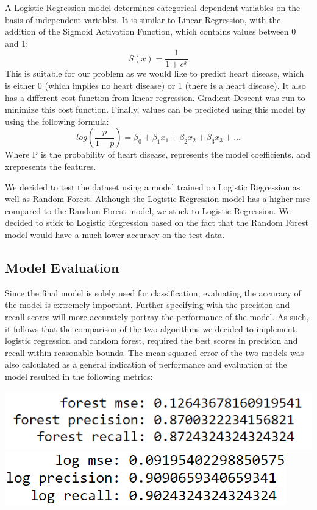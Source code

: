 \documentclass[12pt]{article}
\begin{document}
A Logistic Regression model determines categorical dependent variables on the basis of independent variables. It is similar to Linear Regression, with the addition of the Sigmoid Activation Function, which contains values between 0 and 1: 
$$S(x) = \frac{1}{1+e^x}$$
This is suitable for our problem as we would like to predict heart disease, which is either 0 (which implies no heart disease) or 1 (there is a heart disease). It also has a different cost function from linear regression. Gradient Descent was run to minimize this cost function. Finally, values can be predicted using this model by using the following formula:
$$log(\frac{p}{1-p}) = \beta_0 + \beta_1x_1 + \beta_2x_2 + \beta_3x_3 + \dots$$
Where P is the probability of heart disease, represents the model coefficients, and xrepresents the features.

We decided to test the dataset using a model trained on Logistic Regression as well as Random Forest. Although the Logistic Regression model has a higher mse compared to the Random Forest model, we stuck to Logistic Regression. We decided to stick to Logistic Regression based on the fact that the Random Forest model would have a much lower accuracy on the test data.


\subsection*{Model Evaluation}
Since the final model is solely used for classification, evaluating the accuracy of the model is extremely important. Further specifying with the precision and recall scores will more accurately portray the performance of the model. As such, it follows that the comparison of the two algorithms we decided to implement, logistic regression and random forest, required the best scores in precision and recall within reasonable bounds. The mean squared error of the two models was also calculated as a general indication of performance and evaluation of the model resulted in the following metrics:

\begin{center}
        \includegraphics[width=\textwidth, height=\textheight, keepaspectratio]{images/image3.png}
        \includegraphics[width=\textwidth, height=\textheight, keepaspectratio]{images/image4.png}
\end{center}
\end{document}

